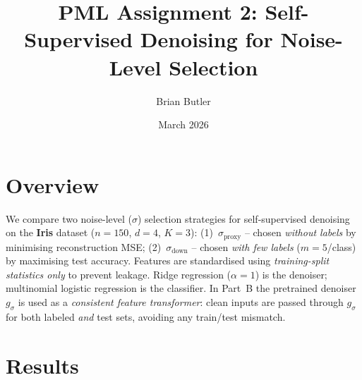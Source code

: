 \documentclass[10pt, letterpaper]{article}
\title{\vspace{-2em}\textbf{PML Assignment 2: Self-Supervised Denoising for Noise-Level Selection}\vspace{-0.5em}}
\author{Brian Butler}
\date{March 2026}
\begin{document}
\maketitle
\vspace{-1em}

\section{Overview}

We compare two noise-level ($\sigma$) selection strategies for self-supervised denoising on the \textbf{Iris} dataset ($n{=}150$, $d{=}4$, $K{=}3$):
(1)~$\sigma_{\text{proxy}}$ -- chosen \emph{without labels} by minimising reconstruction MSE;
(2)~$\sigma_{\text{down}}$ -- chosen \emph{with few labels} ($m{=}5$/class) by maximising test accuracy.
Features are standardised using \emph{training-split statistics only} to prevent leakage. Ridge regression ($\alpha{=}1$) is the denoiser; multinomial logistic regression is the classifier.
In Part~B the pretrained denoiser $g_\sigma$ is used as a \emph{consistent feature transformer}: clean inputs are passed through $g_\sigma$ for both labeled \emph{and} test sets, avoiding any train/test mismatch.

\section{Results}
\end{document}
